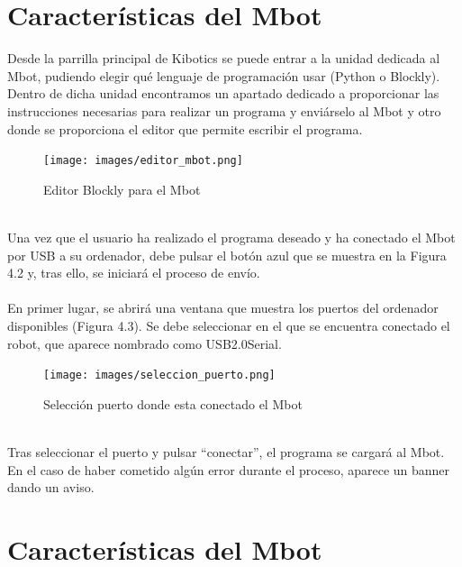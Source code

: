 \documentclass{report}
\begin{document}
\section{Características del Mbot}

Desde la parrilla principal de Kibotics se puede entrar a la unidad dedicada al Mbot, pudiendo elegir qué lenguaje de programación usar (Python o Blockly). Dentro de dicha unidad encontramos un apartado dedicado a proporcionar las instrucciones necesarias para realizar un programa y enviárselo al Mbot y otro donde se proporciona el editor que permite escribir el programa.
\\
\begin{figure}[h!]
  \centering
    \texttt{[image: images/editor\_mbot.png]}
  \caption{Editor Blockly para el Mbot }
  \label{Editor Blockly para el Mbot }
\end{figure}
\\
Una vez que el usuario ha realizado el programa deseado y ha conectado el Mbot por USB a su ordenador, debe pulsar el botón azul que se muestra en la Figura 4.2 y, tras ello, se iniciará el proceso de envío.
\\
\\
En primer lugar, se abrirá una ventana que muestra los puertos del ordenador disponibles (Figura 4.3). Se debe seleccionar en el que se encuentra conectado el robot, que aparece nombrado como USB2.0Serial.
\\
\begin{figure}[h!]
  \centering
    \texttt{[image: images/seleccion\_puerto.png]}
  \caption{Selección puerto donde esta conectado el Mbot}
  \label{Selección puerto donde esta conectado el Mbot}
\end{figure}
\\
Tras seleccionar el puerto y pulsar “conectar”, el programa se cargará al Mbot. En el caso de haber cometido algún error durante el proceso, aparece un banner dando un aviso.

\section{Características del Mbot}
\end{document}
